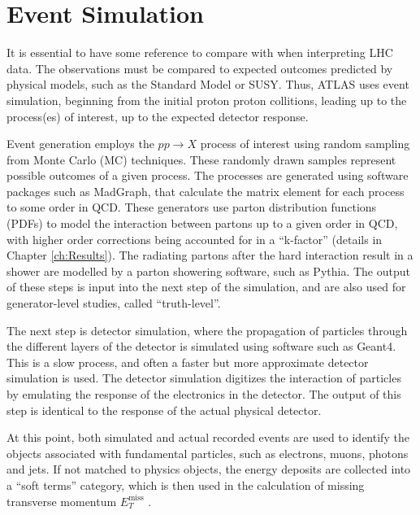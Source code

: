 \documentclass[12pt,a4paper,openright,twoside]{report}
\newcommand{\met}{$E_T^{\mathrm{miss}}$ }
\begin{document}
\section{Event Simulation}
It is essential to have some reference to compare with when interpreting LHC data. The observations must be compared to expected outcomes predicted by physical models, such as the Standard Model or SUSY. Thus, ATLAS uses event simulation, beginning from the initial proton proton collitions, leading up to the process(es) of interest, up to the expected detector response.

Event generation employs the $pp\to X$ process of interest using random sampling from Monte Carlo (MC) techniques. These randomly drawn samples represent possible outcomes of a given process. The processes are generated using software packages such as MadGraph\cite{MadGraph}, that calculate the matrix element for each process to some order in QCD. These generators use parton distribution functions (PDFs) to model the interaction between partons up to a given order in QCD, with higher order corrections being accounted for in a ``k-factor'' (details in Chapter \ref{ch:Results}). The radiating partons after the hard interaction result in a shower are modelled by a parton showering software, such as Pythia\cite{pythia}. The output of these steps is input into the next step of the simulation, and are also used for generator-level studies, called ``truth-level''.

The next step is detector simulation, where the propagation of particles through the different layers of the detector is simulated using software such as Geant4\cite{geant4}. This is a slow process, and often a faster but more approximate detector simulation is used. The detector simulation digitizes the interaction of particles by emulating the response of the electronics in the detector. The output of this step is identical to the response of the actual physical detector.

At this point, both simulated and actual recorded events are used to identify the objects associated with fundamental particles, such as electrons, muons, photons and jets. If not matched to physics objects, the energy deposits are collected into a ``soft terms'' category, which is then used in the calculation of missing transverse momentum \met.
\end{document}
